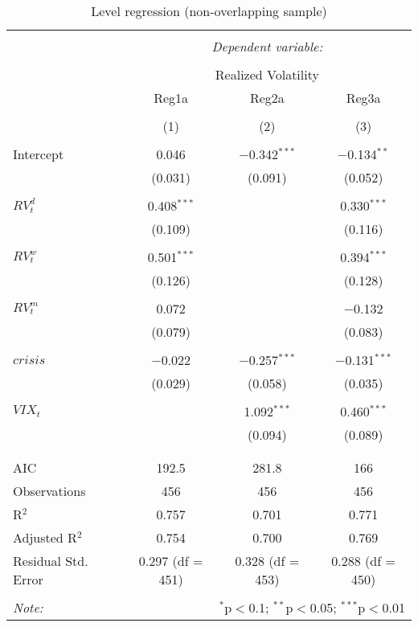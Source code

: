 
\begin{table}[!htbp] \centering 
  \caption{Level regression (non-overlapping sample)} 
  \label{tab:overlap1} 
\begin{tabular}{@{\extracolsep{5pt}}lccc} 
\\[-1.8ex]\hline 
\hline \\[-1.8ex] 
 & \multicolumn{3}{c}{\textit{Dependent variable:}} \\ 
\cline{2-4} 
\\[-1.8ex] & \multicolumn{3}{c}{Realized Volatility} \\ 
 & Reg1a & Reg2a & Reg3a \\ 
\\[-1.8ex] & (1) & (2) & (3)\\ 
\hline \\[-1.8ex] 
 Intercept & 0.046 & $-$0.342$^{***}$ & $-$0.134$^{**}$ \\ 
  & (0.031) & (0.091) & (0.052) \\ 
  & & & \\ 
 $RV^{d}_{t}$ & 0.408$^{***}$ &  & 0.330$^{***}$ \\ 
  & (0.109) &  & (0.116) \\ 
  & & & \\ 
 $RV^{w}_{t}$ & 0.501$^{***}$ &  & 0.394$^{***}$ \\ 
  & (0.126) &  & (0.128) \\ 
  & & & \\ 
 $RV^{m}_{t}$ & 0.072 &  & $-$0.132 \\ 
  & (0.079) &  & (0.083) \\ 
  & & & \\ 
 $crisis$ & $-$0.022 & $-$0.257$^{***}$ & $-$0.131$^{***}$ \\ 
  & (0.029) & (0.058) & (0.035) \\ 
  & & & \\ 
 $VIX_{t}$ &  & 1.092$^{***}$ & 0.460$^{***}$ \\ 
  &  & (0.094) & (0.089) \\ 
  & & & \\ 
\hline \\[-1.8ex] 
AIC & 192.5 & 281.8 & 166 \\ 
Observations & 456 & 456 & 456 \\ 
R$^{2}$ & 0.757 & 0.701 & 0.771 \\ 
Adjusted R$^{2}$ & 0.754 & 0.700 & 0.769 \\ 
Residual Std. Error & 0.297 (df = 451) & 0.328 (df = 453) & 0.288 (df = 450) \\ 
\hline 
\hline \\[-1.8ex] 
\textit{Note:}  & \multicolumn{3}{r}{$^{*}$p$<$0.1; $^{**}$p$<$0.05; $^{***}$p$<$0.01} \\ 
\end{tabular} 
\end{table} 
